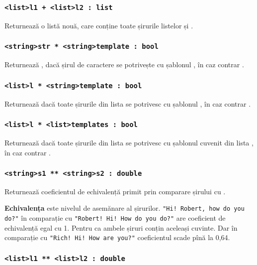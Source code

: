 \subsubsection{\lstinline|<list>l1 + <list>l2 : list|}

Returnează o listă nouă, care conține toate șirurile listelor  și .

\subsubsection{\lstinline|<string>str * <string>template : bool|}

Returnează \true{}, dacă șirul de caractere  se potrivește cu șablonul , în caz contrar \false{}.

\subsubsection{\lstinline|<list>l * <string>template : bool|}

Returnează \true{} dacă toate șirurile din lista  se potrivesc cu șablonul , în caz contrar \false{}.

\subsubsection{\lstinline|<list>l * <list>templates : bool|}

Returnează \true{} dacă toate șirurile din lista  se potrivesc cu șablonul cuvenit din lista , în caz contrar \false{}.

\subsubsection{\lstinline|<string>s1 ** <string>s2 : double|}

Returnează coeficientul de echivalență primit prin comparare șirului  cu .

{\bf Echivalența} este nivelul de asemănare al șirurilor. \lstinline`"Hi! Robert, how do you do?"` în comparație cu \lstinline`"Robert! Hi! How do you do?"` are coeficient de echivalență egal cu 1. Pentru ca ambele șiruri conțin aceleași cuvinte. Dar în comparație cu  \lstinline`"Rich! Hi! How are you?"` coeficientul scade pînă la 0,64.

\subsubsection{\lstinline|<list>l1 ** <list>l2 : double|}

